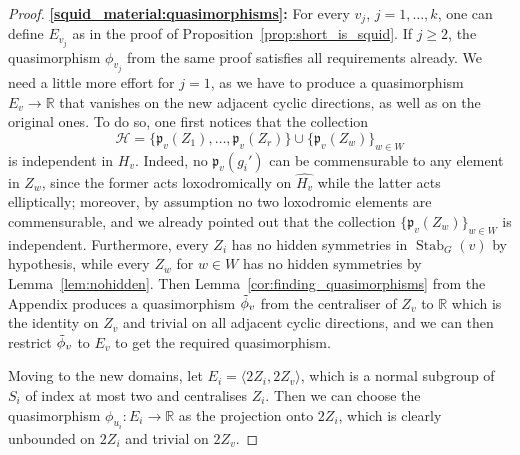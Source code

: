 \documentclass[svgnames]{amsart}
\theoremstyle{plain}
\theoremstyle{definition}
\newcommand{\R}{\mathbb{R}}
\newcommand{\Stab}[2]{\operatorname{Stab}_{#1}(#2)}
\newcommand{\p}{\mathfrak{p}}
\newcommand{\h}{\widehat}
\begin{document}
\begin{proof}
\par\medskip
\textbf{\eqref{squid_material:quasimorphisms}:} 
For every $v_j$, $j=1,\ldots, k$, one can define $E_{v_j}$ as in the proof of Proposition~\ref{prop:short_is_squid}. If $j\ge 2$, the quasimorphism $\phi_{v_j}$ from the same proof satisfies all requirements already. We need a little more effort for $j=1$, as we have to produce a quasimorphism $E_{v}\to \mathbb{R}$ that vanishes on the new adjacent cyclic directions, as well as on the original ones. To do so, one first notices that the collection $$\mathcal H=\{\p_v(Z_1), \ldots, \p_v(Z_r)\}\cup\{\p_v(Z_{w})\}_{w\in W}$$ is independent in $H_v$. Indeed, no $\p_v(g_i')$ can be commensurable to any element in $Z_{w}$, since the former acts loxodromically on $\h{H_v}$ while the latter acts elliptically; moreover, by assumption no two loxodromic elements are commensurable, and we already pointed out that the collection $\{\p_v(Z_{w})\}_{w\in W}$ is independent. Furthermore, every $Z_i$ has no hidden symmetries in $\Stab{G}{v}$ by hypothesis, while every $Z_w$ for $w\in W$ has no hidden symmetries by Lemma~\ref{lem:nohidden}. Then Lemma~\ref{cor:finding_quasimorphisms} from the Appendix produces a quasimorphism $\Tilde{\phi}_v$ from the centraliser of $Z_v$ to $\R$ which is the identity on $Z_v$ and trivial on all adjacent cyclic directions, and we can then restrict $\Tilde{\phi}_v$ to $E_v$ to get the required quasimorphism.


Moving to the new domains, let $E_i=\langle 2Z_i, 2Z_v\rangle$, which is a normal subgroup of $S_i$ of index at most two and centralises $Z_i$. Then we can choose the quasimorphism $\phi_{u_i}\colon E_i\to \mathbb{R}$ as the projection onto $2Z_i$, which is clearly unbounded on $2Z_i$ and trivial on $2Z_v$. 


\end{proof}
\end{document}
